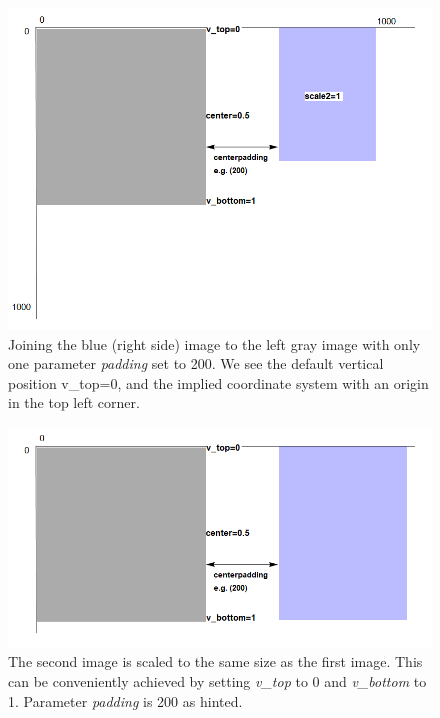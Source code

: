 \documentclass[a4paper, 12pt, bibliography=totoc]{scrartcl}
\begin{document}
\begin{figure}[H]
	\centering
	\includegraphics[width=0.8\linewidth]{images/svgjoinpad200.png}
	\caption{Joining the blue (right side) image to the left gray image with only one parameter \textit{padding} set to 200. We see the default vertical position v\_top=0, and the implied coordinate system with an origin in the top left corner.}
	\label{fig:svgjoinpad200}
\end{figure}

\begin{figure}[H]
	\centering
	\includegraphics[width=0.8\linewidth]{images/svgjoinscale1.png}
	\caption{The second image is scaled to the same size as the first image. This can be conveniently achieved by setting \textit{v\_top} to 0 and \textit{v\_bottom} to 1. Parameter \textit{padding} is 200 as hinted.}
	\label{fig:svgjoinscale1}
\end{figure}
\end{document}
